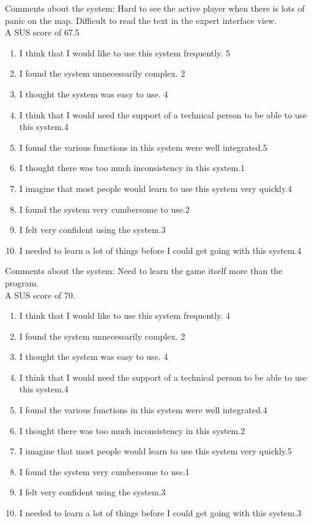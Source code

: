 Comments about the system: Hard to see the active player when there is lots of panic on the map. Difficult to read the text in the expert interface view.\\
A SUS score of 67.5\\

\begin{enumerate} \setlength{\itemsep}{0cm}\setlength{\parskip}{0cm}
	\item I think that I would like to use this system frequently. \hfill 5 
	\item I found the system unnecessarily complex. \hfill 2
	\item I thought the system was easy to use. \hfill 4
	\item I think that I would need the support of a technical person to be able to use this system.\hfill 4
	\item I found the various functions in this system were well integrated.\hfill 5
	\item I thought there was too much inconsistency in this system.\hfill 1
	\item I imagine that most people would learn to use this system very quickly.\hfill 4
	\item I found the system very cumbersome to use.\hfill 2
	\item I felt very confident using the system.\hfill 3
	\item I needed to learn a lot of things before I could get going with this system.\hfill 4
\end{enumerate}

Comments about the system: Need to learn the game itself more than the program.\\
A SUS score of 70.\\

\begin{enumerate} \setlength{\itemsep}{0cm}\setlength{\parskip}{0cm}
	\item I think that I would like to use this system frequently. \hfill 4
	\item I found the system unnecessarily complex. \hfill 2
	\item I thought the system was easy to use. \hfill 4
	\item I think that I would need the support of a technical person to be able to use this system.\hfill 4
	\item I found the various functions in this system were well integrated.\hfill 4
	\item I thought there was too much inconsistency in this system.\hfill 2
	\item I imagine that most people would learn to use this system very quickly.\hfill 5
	\item I found the system very cumbersome to use.\hfill 1
	\item I felt very confident using the system.\hfill 3
	\item I needed to learn a lot of things before I could get going with this system.\hfill 3
\end{enumerate}

